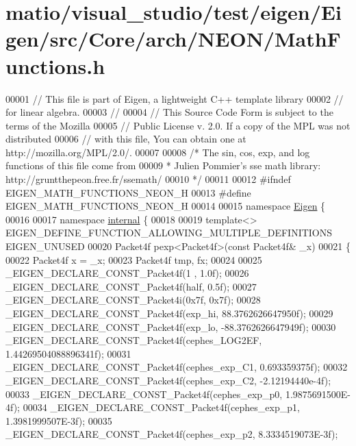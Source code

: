 \hypertarget{matio_2visual__studio_2test_2eigen_2_eigen_2src_2_core_2arch_2_n_e_o_n_2_math_functions_8h_source}{}\section{matio/visual\+\_\+studio/test/eigen/\+Eigen/src/\+Core/arch/\+N\+E\+O\+N/\+Math\+Functions.h}
\label{matio_2visual__studio_2test_2eigen_2_eigen_2src_2_core_2arch_2_n_e_o_n_2_math_functions_8h_source}

\begin{DoxyCode}
00001 \textcolor{comment}{// This file is part of Eigen, a lightweight C++ template library}
00002 \textcolor{comment}{// for linear algebra.}
00003 \textcolor{comment}{//}
00004 \textcolor{comment}{// This Source Code Form is subject to the terms of the Mozilla}
00005 \textcolor{comment}{// Public License v. 2.0. If a copy of the MPL was not distributed}
00006 \textcolor{comment}{// with this file, You can obtain one at http://mozilla.org/MPL/2.0/.}
00007 
00008 \textcolor{comment}{/* The sin, cos, exp, and log functions of this file come from}
00009 \textcolor{comment}{ * Julien Pommier's sse math library: http://gruntthepeon.free.fr/ssemath/}
00010 \textcolor{comment}{ */}
00011 
00012 \textcolor{preprocessor}{#ifndef EIGEN\_MATH\_FUNCTIONS\_NEON\_H}
00013 \textcolor{preprocessor}{#define EIGEN\_MATH\_FUNCTIONS\_NEON\_H}
00014 
00015 \textcolor{keyword}{namespace }\hyperlink{namespace_eigen}{Eigen} \{
00016 
00017 \textcolor{keyword}{namespace }\hyperlink{namespaceinternal}{internal} \{
00018 
00019 \textcolor{keyword}{template}<> EIGEN\_DEFINE\_FUNCTION\_ALLOWING\_MULTIPLE\_DEFINITIONS EIGEN\_UNUSED
00020 Packet4f pexp<Packet4f>(\textcolor{keyword}{const} Packet4f& \_x)
00021 \{
00022   Packet4f x = \_x;
00023   Packet4f tmp, fx;
00024 
00025   \_EIGEN\_DECLARE\_CONST\_Packet4f(1 , 1.0f);
00026   \_EIGEN\_DECLARE\_CONST\_Packet4f(half, 0.5f);
00027   \_EIGEN\_DECLARE\_CONST\_Packet4i(0x7f, 0x7f);
00028   \_EIGEN\_DECLARE\_CONST\_Packet4f(exp\_hi,  88.3762626647950f);
00029   \_EIGEN\_DECLARE\_CONST\_Packet4f(exp\_lo, -88.3762626647949f);
00030   \_EIGEN\_DECLARE\_CONST\_Packet4f(cephes\_LOG2EF, 1.44269504088896341f);
00031   \_EIGEN\_DECLARE\_CONST\_Packet4f(cephes\_exp\_C1, 0.693359375f);
00032   \_EIGEN\_DECLARE\_CONST\_Packet4f(cephes\_exp\_C2, -2.12194440e-4f);
00033   \_EIGEN\_DECLARE\_CONST\_Packet4f(cephes\_exp\_p0, 1.9875691500E-4f);
00034   \_EIGEN\_DECLARE\_CONST\_Packet4f(cephes\_exp\_p1, 1.3981999507E-3f);
00035   \_EIGEN\_DECLARE\_CONST\_Packet4f(cephes\_exp\_p2, 8.3334519073E-3f);

\end{DoxyCode}
